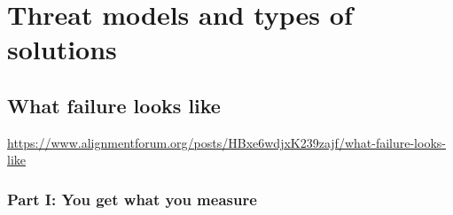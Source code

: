 
\chapter{Threat models and types of solutions}

\section{What failure looks like}

\url{https://www.alignmentforum.org/posts/HBxe6wdjxK239zajf/what-failure-looks-like}


\subsection{Part I: You get what you measure}

